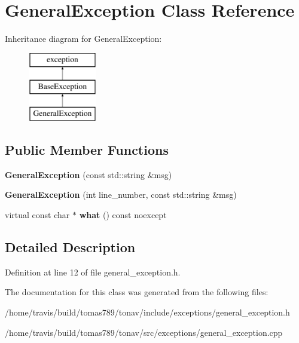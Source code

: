 \hypertarget{class_general_exception}{\section{General\-Exception Class Reference}
\label{class_general_exception}
}
Inheritance diagram for General\-Exception\-:\begin{figure}[H]
\begin{center}
\leavevmode
\includegraphics[height=3.000000cm]{class_general_exception}
\end{center}
\end{figure}
\subsection*{Public Member Functions}
\begin{DoxyCompactItemize}
\item 
\hypertarget{class_general_exception_ae9a9599d82aa29bef098dbb594e2f13e}{{\bfseries General\-Exception} (const std\-::string \&msg)}\label{class_general_exception_ae9a9599d82aa29bef098dbb594e2f13e}

\item 
\hypertarget{class_general_exception_ab6bb7c8ae3ab248e082d7fbf3f4a2cf3}{{\bfseries General\-Exception} (int line\-\_\-number, const std\-::string \&msg)}\label{class_general_exception_ab6bb7c8ae3ab248e082d7fbf3f4a2cf3}

\item 
\hypertarget{class_general_exception_a1d8d27063e77fe4658daa8279d0af52c}{virtual const char $\ast$ {\bfseries what} () const noexcept}\label{class_general_exception_a1d8d27063e77fe4658daa8279d0af52c}

\end{DoxyCompactItemize}


\subsection{Detailed Description}


Definition at line 12 of file general\-\_\-exception.\-h.



The documentation for this class was generated from the following files\-:\begin{DoxyCompactItemize}
\item 
/home/travis/build/tomas789/tonav/include/exceptions/general\-\_\-exception.\-h\item 
/home/travis/build/tomas789/tonav/src/exceptions/general\-\_\-exception.\-cpp\end{DoxyCompactItemize}
